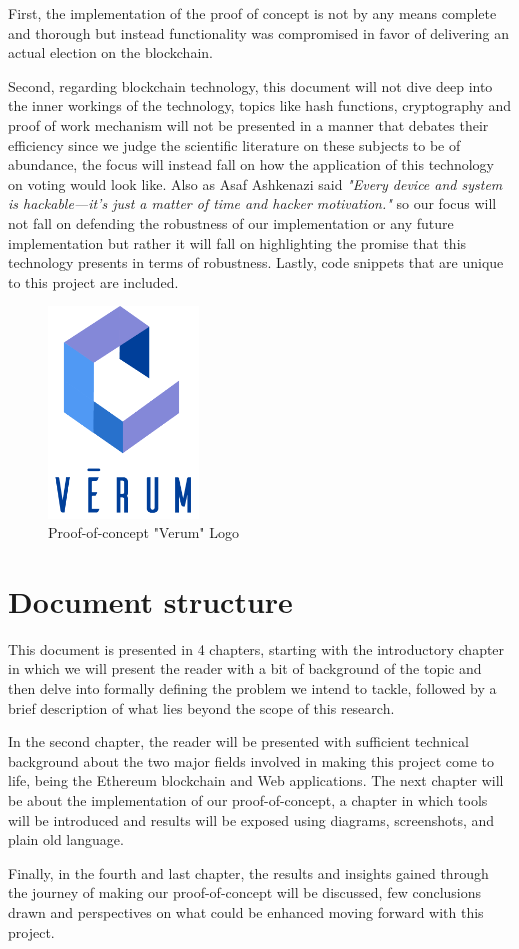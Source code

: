 First, the implementation of the proof of concept is not by any means complete and thorough but instead functionality was compromised in favor of delivering an actual election on the blockchain.

Second, regarding blockchain technology, this document will not dive deep into the inner workings of the technology, topics like hash functions, cryptography and proof of work mechanism will not be presented in a manner that debates their efficiency since we judge the scientific literature on these subjects to be of abundance, the focus will instead fall on how the application of this technology on voting would look like. Also as Asaf Ashkenazi said \textit{"Every device and system is hackable—it’s just a matter of time and hacker motivation."}\cite{CybersecurityExpertWarns} so our focus will not fall on defending the robustness of our implementation or any future implementation but rather it will fall on highlighting the promise that this technology presents in terms of robustness.
Lastly, code snippets that are unique to this project are included.

\begin{figure}[h]
	\centering
		\includegraphics[width=4cm]{images/chapter1/verum.png}
		\caption{{\footnotesize Proof-of-concept "Verum" Logo}}
\end{figure}

\section{Document structure}
This document is presented in 4 chapters, starting with the introductory chapter in which we will present the reader with a bit of background of the topic and then delve into formally defining the problem we intend to tackle, followed by a brief description of what lies beyond the scope of this research.

In the second chapter, the reader will be presented with sufficient technical background about the two major fields involved in making this project come to life, being the Ethereum blockchain and Web applications. The next chapter will be about the implementation of our proof-of-concept, a chapter in which tools will be introduced and results will be exposed using diagrams, screenshots, and plain old language.

Finally, in the fourth and last chapter, the results and insights gained through the journey of making our proof-of-concept will be discussed, few conclusions drawn and perspectives on what could be enhanced moving forward with this project.

